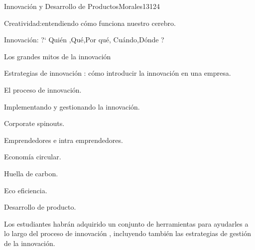 \begin{syllabus}
\begin{competences}
    \item {}
    \item {}
    \item {}
    \item {}
\end{competences}

\begin{unit}{Innovación y Desarrollo de Productos}{}{Morales13}{12}{4}
   \begin{topics}
      \item Creatividad:entendiendo cómo funciona nuestro cerebro.
      \item Innovación: ?` Quién ,Qué,Por qué, Cuándo,Dónde ?
      \item Los grandes mitos de la innovación
      \item Estrategias de innovación : cómo introducir la innovación en una empresa.
      \item El proceso de innovación.
      \item Implementando y gestionando la innovación.
      \item Corporate spinouts.
      \item Emprendedores e intra emprendedores.
      \item Economía circular.
      \item Huella de carbon.
      \item Eco eficiencia.
      \item Desarrollo de producto.
   \end{topics}
   \begin{learningoutcomes}
      \item Los estudiantes habrán adquirido un conjunto de herramientas para ayudarles a lo largo del proceso de innovación , incluyendo también las estrategias de gestión de la innovación.
   \end{learningoutcomes}
\end{unit}



\begin{coursebibliography}
\end{coursebibliography}

\end{syllabus}
